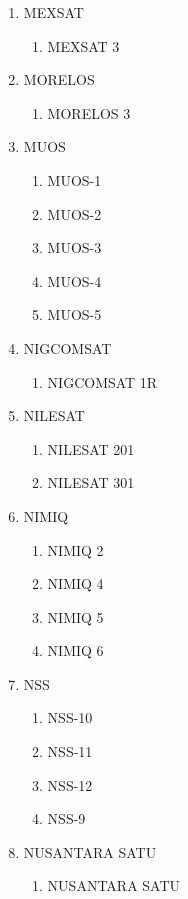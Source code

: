 \begin{multicols}{2}
\begin{enumerate}
\begin{enumerate}
    \item MEV-2
  \end{enumerate}
  \item MEXSAT
  \begin{enumerate}
    \item MEXSAT 3
  \end{enumerate}
  \item MORELOS
  \begin{enumerate}
    \item MORELOS 3
  \end{enumerate}
  \item MUOS
  \begin{enumerate}
    \item MUOS-1
    \item MUOS-2
    \item MUOS-3
    \item MUOS-4
    \item MUOS-5
  \end{enumerate}
  \item NIGCOMSAT
  \begin{enumerate}
    \item NIGCOMSAT 1R
  \end{enumerate}
  \item NILESAT
  \begin{enumerate}
    \item NILESAT 201
    \item NILESAT 301
  \end{enumerate}
  \item NIMIQ
  \begin{enumerate}
    \item NIMIQ 2
    \item NIMIQ 4
    \item NIMIQ 5
    \item NIMIQ 6
  \end{enumerate}
  \item NSS
  \begin{enumerate}
    \item NSS-10
    \item NSS-11
    \item NSS-12
    \item NSS-9
  \end{enumerate}
  \item NUSANTARA SATU
  \begin{enumerate}
    \item NUSANTARA SATU
  \end{enumerate}

\end{enumerate}
\end{multicols}
